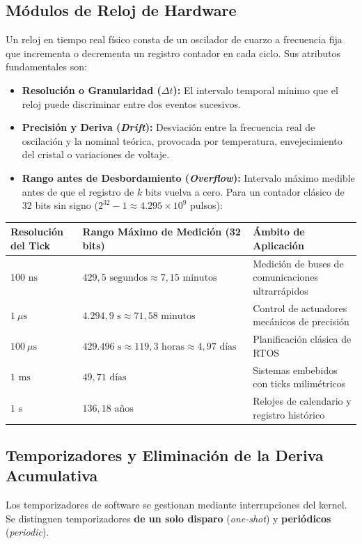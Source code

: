 \subsection{Módulos de Reloj de Hardware}
Un reloj en tiempo real físico consta de un oscilador de cuarzo a frecuencia fija que incrementa o decrementa un registro contador en cada ciclo. Sus atributos fundamentales son:
\begin{itemize}[leftmargin=*]
    \item \textbf{Resolución o Granularidad ($\Delta t$):} El intervalo temporal mínimo que el reloj puede discriminar entre dos eventos sucesivos.
    \item \textbf{Precisión y Deriva (\textit{Drift}):} Desviación entre la frecuencia real de oscilación y la nominal teórica, provocada por temperatura, envejecimiento del cristal o variaciones de voltaje.
    \item \textbf{Rango antes de Desbordamiento (\textit{Overflow}):} Intervalo máximo medible antes de que el registro de $k$ bits vuelva a cero. Para un contador clásico de 32 bits sin signo ($2^{32} - 1 \approx 4.295 \times 10^9$ pulsos):
\end{itemize}

\begin{table}[h!]
\centering
\small
\begin{tabular}{p{3cm} p{5.5cm} p{5.5cm}}
\toprule
\textbf{Resolución del Tick} & \textbf{Rango Máximo de Medición (32 bits)} & \textbf{Ámbito de Aplicación} \\
\midrule
$100\text{ ns}$ & $429{,}5\text{ segundos} \approx 7{,}15\text{ minutos}$ & Medición de buses de comunicaciones ultrarrápidos \\
$1\ \mu\text{s}$ & $4.294{,}9\text{ s} \approx 71{,}58\text{ minutos}$ & Control de actuadores mecánicos de precisión \\
$100\ \mu\text{s}$ & $429.496\text{ s} \approx 119{,}3\text{ horas} \approx 4{,}97\text{ días}$ & Planificación clásica de RTOS \\
$1\text{ ms}$ & $49{,}71\text{ días}$ & Sistemas embebidos con ticks milimétricos \\
$1\text{ s}$ & $136{,}18\text{ años}$ & Relojes de calendario y registro histórico \\
\bottomrule
\end{tabular}
\end{table}

\subsection{Temporizadores y Eliminación de la Deriva Acumulativa}
Los temporizadores de software se gestionan mediante interrupciones del kernel. Se distinguen temporizadores \textbf{de un solo disparo} (\textit{one-shot}) y \textbf{periódicos} (\textit{periodic}).

